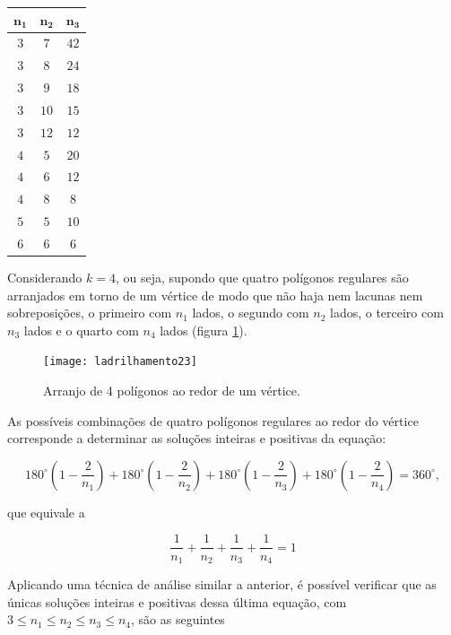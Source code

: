 \begin{table}[H]
\setlength\tabcolsep{5mm}
\centering
\begin{tabu} to \textwidth{|c|c|c|}
\hline
$\bm{n_1}$ & $\bm{n_2}$ & $\bm{n_3}$ \\
\hline
$3$ & $7$ & $42$ \\
\hline
$3$ & $8$ & $24$ \\
\hline
$3$ & $9$ & $18$ \\
\hline
$3$ & $10$ & $15$ \\
\hline
$3$ & $12$ & $12$ \\
\hline
$4$ & $5$ & $20$ \\
\hline
$4$ & $6$ & $12$ \\
\hline
$4$ & $8$ & $8$ \\
\hline
$5$ & $5$ & $10$ \\
\hline
$6$ & $6$ & $6$ \\
\hline
\end{tabu}
\end{table}

Considerando $k=4$, ou seja, supondo que quatro polígonos regulares são arranjados em torno de um vértice de modo que não haja nem lacunas nem sobreposições, o primeiro com $n_1$ lados, o segundo com $n_2$ lados, o terceiro com $n_3$ lados e o quarto com $n_4$ lados (figura \ref{lad_tp5}).

\begin{figure}[H]
\centering
\texttt{[image: ladrilhamento23]}
\label{lad_tp5}
\caption{Arranjo de 4 polígonos ao redor de um vértice.}
\end{figure}

As possíveis combinações de quatro polígonos regulares ao redor do vértice corresponde a determinar as soluções inteiras e positivas da equação:

\begin{equation*}
180^{\circ}\left(1-\frac{2}{n_1}\right)+180^{\circ}\left(1-\frac{2}{n_2}\right)+180^{\circ}\left(1-\frac{2}{n_3}\right)+180^{\circ}\left(1-\frac{2}{n_4}\right)=360^{\circ},
\end{equation*}

que equivale a

\begin{equation*}
\frac{1}{n_1}+\frac{1}{n_2}+\frac{1}{n_3}+\frac{1}{n_4}=1
\end{equation*}

Aplicando uma técnica de análise similar a anterior, é possível verificar que as únicas soluções inteiras e positivas dessa última equação, com $3\leq n_1\leq n_2 \leq n_3 \leq n_4$, são as seguintes

